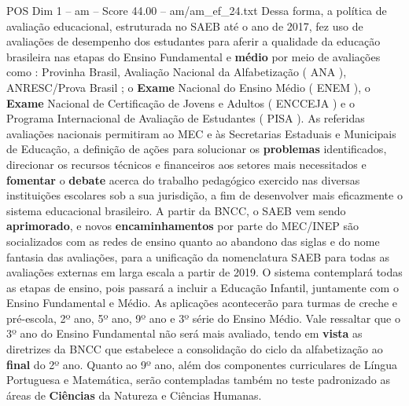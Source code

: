 \begin{textsample}{POS Dim 1 – am – Score 44.00 – am/am\_ef\_24.txt}
Dessa forma, a política de avaliação educacional, estruturada no SAEB até o ano de 2017, fez uso de avaliações de desempenho dos estudantes para aferir a qualidade da educação brasileira nas etapas do Ensino Fundamental e \textbf{médio} por meio de avaliações como : Provinha Brasil, Avaliação Nacional da Alfabetização ( ANA ), ANRESC/Prova Brasil ; o \textbf{Exame} Nacional do Ensino Médio ( ENEM ), o \textbf{Exame} Nacional de Certificação de Jovens e Adultos ( ENCCEJA ) e o Programa Internacional de Avaliação de Estudantes ( PISA ).
As referidas avaliações nacionais permitiram ao MEC e às Secretarias Estaduais e Municipais de Educação, a definição de ações para solucionar os \textbf{problemas} identificados, direcionar os recursos técnicos e financeiros aos setores mais necessitados e \textbf{fomentar} o \textbf{debate} acerca do trabalho pedagógico exercido nas diversas instituições escolares sob a sua jurisdição, a fim de desenvolver mais eficazmente o sistema educacional brasileiro.
A partir da BNCC, o SAEB vem sendo \textbf{aprimorado}, e novos \textbf{encaminhamentos} por parte do MEC/INEP são socializados com as redes de ensino quanto ao abandono das siglas e do nome fantasia das avaliações, para a unificação da nomenclatura SAEB para todas as avaliações externas em larga escala a partir de 2019.
O sistema contemplará todas as etapas de ensino, pois passará a incluir a Educação Infantil, juntamente com o Ensino Fundamental e Médio.
As aplicações acontecerão para turmas de creche e pré-escola, 2º ano, 5º ano, 9º ano e 3º série do Ensino Médio.
Vale ressaltar que o 3º ano do Ensino Fundamental não será mais avaliado, tendo em \textbf{vista} as diretrizes da BNCC que estabelece a consolidação do ciclo da alfabetização ao \textbf{final} do 2º ano.
Quanto ao 9º ano, além dos componentes curriculares de Língua Portuguesa e Matemática, serão contempladas também no teste padronizado as áreas de \textbf{Ciências} da Natureza e Ciências Humanas.

\end{textsample}
